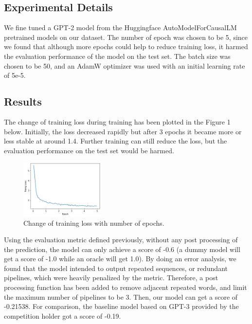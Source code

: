 \subsection{Experimental Details}
We fine tuned a GPT-2 model from the Huggingface AutoModelForCausalLM pretrained models on our dataset. The number of epoch was chosen to be 5, since we found that although more epochs could help to reduce training loss, it harmed the evaluation performance of the model on the test set. The batch size was chosen to be 50, and an AdamW optimizer was used with an initial learning rate of 5e-5.

\subsection{Results}
The change of training loss during training has been plotted in the Figure 1 below. Initially, the loss decreased rapidly but after 3 epochs it became more or less stable at around 1.4. Further training can still reduce the loss, but the evaluation performance on the test set would be harmed.

\begin{figure}[ht!]
    \centering
    \includegraphics[width = 160px]{MilestoneReport/training_loss.png} 
    \caption{Change of training loss with number of epochs.}
    \label{overfitting}
\end{figure}

Using the evaluation metric defined previously, without any post processing of the prediction, the model can only achieve a score of -0.6 (a dummy model will get a score of -1.0 while an oracle will get 1.0). By doing an error analysis, we found that the model intended to output repeated sequences, or redundant pipelines, which were heavily penalized by the metric. Therefore, a post processing function has been added to remove adjacent repeated words, and limit the maximum number of pipelines to be 3. Then, our model can get a score of -0.21538. For comparison, the baseline model based on GPT-3 provided by the competition holder got a score of -0.19.

